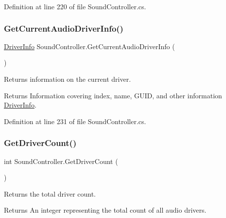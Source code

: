 Definition at line 220 of file Sound\+Controller.\+cs.

\mbox{\label{class_sound_controller_ad41461f18e95fd286970ab750416f908}} 
\subsubsection{\texorpdfstring{Get\+Current\+Audio\+Driver\+Info()}{GetCurrentAudioDriverInfo()}}
{\footnotesize\ttfamily \hyperlink{struct_driver_info}{Driver\+Info} Sound\+Controller.\+Get\+Current\+Audio\+Driver\+Info (\begin{DoxyParamCaption}{ }\end{DoxyParamCaption})}



Returns information on the current driver. 

\begin{DoxyReturn}{Returns}
Information covering index, name, G\+U\+ID, and other information \hyperlink{struct_driver_info}{Driver\+Info}. 
\end{DoxyReturn}


Definition at line 231 of file Sound\+Controller.\+cs.

\mbox{\label{class_sound_controller_a24de360abb2e93bcf2b220163b1ec2c2}} 
\subsubsection{\texorpdfstring{Get\+Driver\+Count()}{GetDriverCount()}}
{\footnotesize\ttfamily int Sound\+Controller.\+Get\+Driver\+Count (\begin{DoxyParamCaption}{ }\end{DoxyParamCaption})}



Returns the total driver count. 

\begin{DoxyReturn}{Returns}
An integer representing the total count of all audio drivers. 
\end{DoxyReturn}


